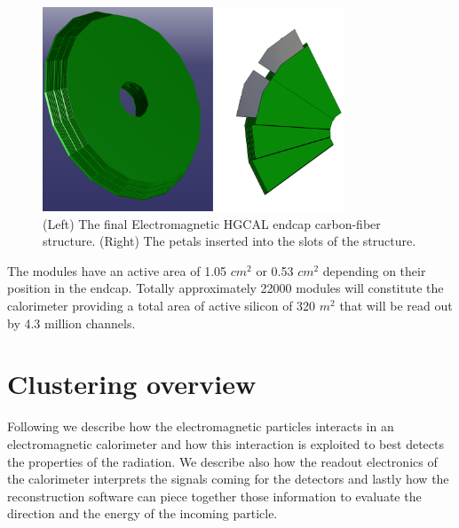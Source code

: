 \begin{figure}
\centerline{\includegraphics[width=0.8\textwidth]{intro/hgcalStruct.png}}
\caption{(Left) The final Electromagnetic HGCAL endcap carbon-fiber structure. (Right) The petals inserted into the slots of the structure.}
\label{hgcalStruct}
\end{figure}

The modules have an active area of 1.05 $\unit{cm^2}$ or 0.53 $\unit{cm^2}$ depending on their position in the endcap. Totally approximately 22000 modules will constitute the calorimeter providing a total area of active silicon of 320 $\unit{m^2}$ that will be read out by 4.3 million channels.\\


\section{Clustering overview}\label{sec:hgcal_clustering}
Following we describe how the electromagnetic particles interacts in an electromagnetic calorimeter and how this interaction is exploited to best detects the properties of the radiation. We describe also how the readout electronics of the calorimeter interprets the signals coming for the detectors and lastly how the reconstruction software can piece together those information to evaluate the direction and the energy of the incoming particle.

